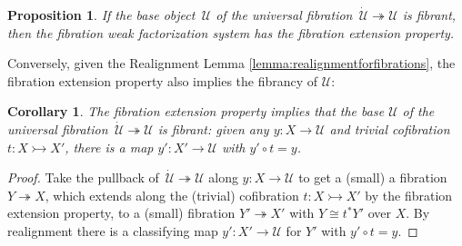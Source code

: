 \documentclass[11pt]{amsart}
\newcommand{\CC}{\ensuremath{\mathcal{C}}}
\newcommand{\Set}{\ensuremath{\mathsf{Set}}}
\newcommand{\mono}{\ensuremath{\rightarrowtail}}
\newcommand{\ra}{\ensuremath{\rightarrow}}
\newcommand{\cof}{\ensuremath{\rightarrowtail}}
\newcommand{\fib}{\ensuremath{\twoheadrightarrow}}
\newcommand{\onto}{\ensuremath{\twoheadrightarrow}}
\newcommand{\I}{\ensuremath{\mathrm{I}}}
\newcommand{\U}{\ensuremath{\mathcal{U}}}
\newcommand{\UU}{\ensuremath{\,\dot{\mathcal{U}}}}
\newtheorem{proposition}[theorem]{Proposition}
\newtheorem{corollary}[theorem]{Corollary}
\theoremstyle{remark}
\theoremstyle{definition}
\begin{document}
\begin{proposition}\label{prop:UfibtoFEP}
If the base object $\,\U$ of the universal fibration $\UU\fib\U$ is fibrant, then the fibration weak factorization system has the fibration extension property.
\end{proposition}

Conversely, given the Realignment Lemma \ref{lemma:realignmentforfibrations}, the fibration extension property also implies the fibrancy of $\U$:

\begin{corollary}
The fibration extension property implies that the base $\U$ of the universal fibration $\UU\fib\U$ is fibrant: given any $y : X \ra \U$ and trivial cofibration $t : X\cof X'$, there is a map $y' : X' \ra \U$  with $y'\circ t = y$.
\end{corollary}

\begin{proof}
Take the pullback of $\UU\fib\U$ along $y : X \ra \U$ to get a (small) a fibration $Y\fib X$, which extends along the (trivial) cofibration $t : X\cof X'$ by the fibration extension property,  to a (small) fibration $Y'\onto X'$ with $Y \cong t^*Y'$ over $X$.  By realignment there is a classifying map $y' : X' \ra \U$ for $Y'$ with $y'\circ t = y$.
\end{proof}

%
%
\end{document}
